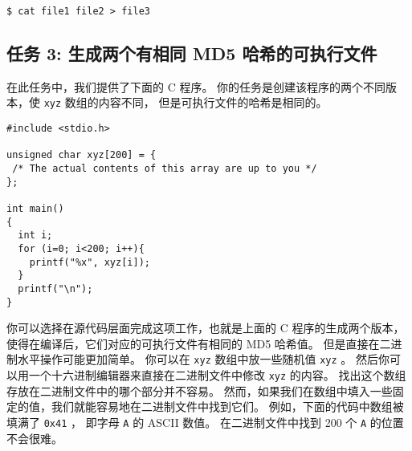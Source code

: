 \begin{lstlisting}
$ cat file1 file2 > file3
\end{lstlisting}






\subsection{任务 3: 生成两个有相同 MD5 哈希的可执行文件}

在此任务中，我们提供了下面的 C 程序。
你的任务是创建该程序的两个不同版本，使 \texttt{xyz} 数组的内容不同，
但是可执行文件的哈希是相同的。


\begin{lstlisting}
#include <stdio.h>

unsigned char xyz[200] = {
 /* The actual contents of this array are up to you */
};

int main()
{
  int i;
  for (i=0; i<200; i++){
    printf("%x", xyz[i]);
  }
  printf("\n");
}
\end{lstlisting}


你可以选择在源代码层面完成这项工作，也就是上面的 C 程序的生成两个版本，
使得在编译后，它们对应的可执行文件有相同的 MD5 哈希值。
但是直接在二进制水平操作可能更加简单。
你可以在 \texttt{xyz} 数组中放一些随机值 \texttt{xyz} 。
然后你可以用一个十六进制编辑器来直接在二进制文件中修改 \texttt{xyz} 的内容。
找出这个数组存放在二进制文件中的哪个部分并不容易。
然而，如果我们在数组中填入一些固定的值，我们就能容易地在二进制文件中找到它们。
例如，下面的代码中数组被填满了 \texttt{0x41} ， 即字母 \texttt{A} 的 ASCII 数值。
在二进制文件中找到 200 个 \texttt{A} 的位置不会很难。

